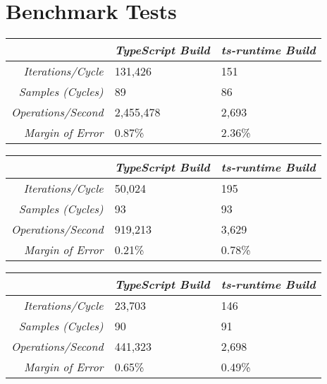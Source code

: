\section{Benchmark Tests}
\label{app:sec:benchmark-results}

\begin{minipage}{\textwidth}
\begin{center}
{
\centering
\tabulinesep=1.2mm
\setlength{\tabcolsep}{5mm}
\def\arraystretch{1.25}
\small
\begin{tabu} to \textwidth {|r||X[c,m]|X[c,m]|}
  \hline
  & \emph{TypeScript Build} & \emph{ts-runtime Build} \\
  \hline
  \hline
  \emph{Iterations/Cycle}  & 131,426 & 151 \\
  \hline
  \emph{Samples (Cycles)}  & 89 & 86 \\
  \hline
  \emph{Operations/Second} & 2,455,478 & 2,693 \\
  \hline
  \emph{Margin of Error}   & 0.87\% & 2.36\% \\
  \hline
\end{tabu}
}
\end{center}

\begin{center}
{
\centering
\tabulinesep=1.2mm
\setlength{\tabcolsep}{5mm}
\def\arraystretch{1.25}
\small
\begin{tabu} to \textwidth {|r||X[c,m]|X[c,m]|}
  \hline
  & \emph{TypeScript Build} & \emph{ts-runtime Build} \\
  \hline
  \hline
  \emph{Iterations/Cycle}  & 50,024 & 195 \\
  \hline
  \emph{Samples (Cycles)}  & 93 & 93 \\
  \hline
  \emph{Operations/Second} & 919,213 & 3,629 \\
  \hline
  \emph{Margin of Error}   & 0.21\% & 0.78\% \\
  \hline
\end{tabu}
}
\end{center}

\begin{center}
{
\centering
\tabulinesep=1.2mm
\setlength{\tabcolsep}{5mm}
\def\arraystretch{1.25}
\small
\begin{tabu} to \textwidth {|r||X[c,m]|X[c,m]|}
  \hline
  & \emph{TypeScript Build} & \emph{ts-runtime Build} \\
  \hline
  \hline
  \emph{Iterations/Cycle}  & 23,703 & 146 \\
  \hline
  \emph{Samples (Cycles)}  & 90 & 91 \\
  \hline
  \emph{Operations/Second} & 441,323 & 2,698 \\
  \hline
  \emph{Margin of Error}   & 0.65\% & 0.49\% \\
  \hline
\end{tabu}
}
\end{center}


\end{minipage}
